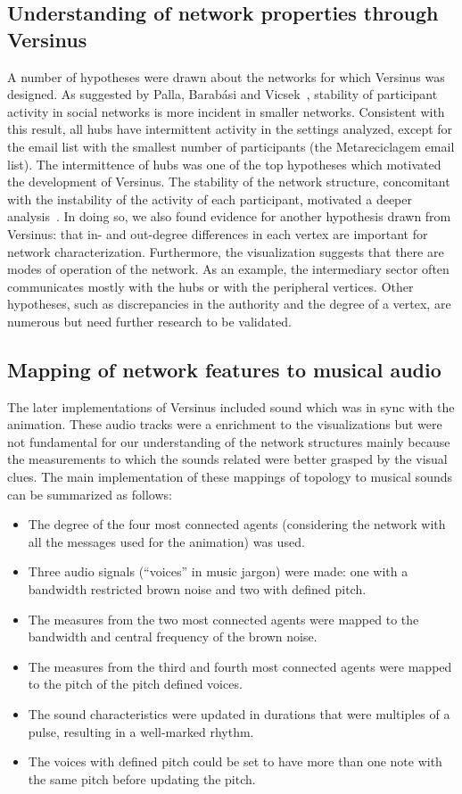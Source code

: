 \subsection{Understanding of network properties through Versinus}\label{sec:enVer}
A number of hypotheses were drawn about the networks for which Versinus was designed.
As suggested by Palla, Barab\'asi and Vicsek~\cite{barabasiEvo}, stability of participant activity in social networks is more incident in smaller networks.
Consistent with this result, all hubs have intermittent activity in the settings analyzed, except for the email list with the smallest number of participants (the Metareciclagem email list).
The intermittence of hubs was one of the top hypotheses which motivated the development of Versinus.
The stability of the network structure, concomitant with the instability of the activity of each participant,
motivated a deeper analysis~\cite{stab}.
In doing so, we also found evidence for another hypothesis drawn from Versinus:
that in- and out-degree differences in each vertex are important for network characterization.
Furthermore, the visualization suggests that there are modes of operation of the network.
As an example, the intermediary sector often communicates mostly with the hubs or with the peripheral vertices.
Other hypotheses,
such as discrepancies in the authority and the degree of a vertex,
are numerous but need further research to be validated.

\subsection{Mapping of network features to musical audio}\label{sec:veraud}
The later implementations of Versinus included sound
which was in sync with the animation.
These audio tracks were a enrichment to the visualizations
but were not fundamental for our understanding of the network structures
mainly because the measurements to which the sounds related were better
grasped by the visual clues.
The main implementation of these mappings of topology to musical sounds
can be summarized as follows:
\begin{itemize}
	\item The degree of the four most connected agents (considering the network with all the messages used for the animation) was used.
	\item Three audio signals (``voices'' in music jargon) were made: one with a bandwidth restricted brown noise and two with defined pitch.
	\item The measures from the two most connected agents were mapped to the bandwidth and central frequency of the brown noise.
	\item The measures from the third and fourth most connected agents were mapped to the pitch of the pitch defined voices.
	\item The sound characteristics were updated in durations that were multiples of a pulse, resulting in a well-marked rhythm.
	\item The voices with defined pitch could be set to have more than one note with the same pitch before updating the pitch.
\end{itemize}


